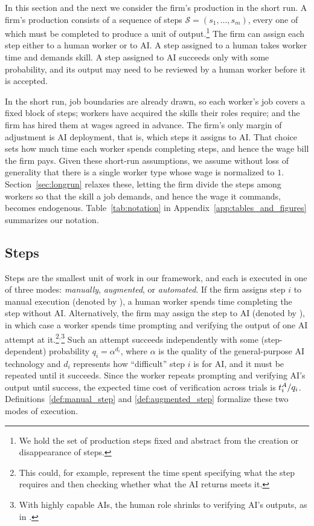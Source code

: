 In this section and the next we consider the firm's production in the short run.
A firm's production consists of a sequence of steps $\mathcal{S}=(s_1,\ldots,s_m)$, every one of which must be completed to produce a unit of output.\footnote{
We hold the set of production steps fixed and abstract from the creation or disappearance of steps.
}
The firm can assign each step either to a human worker or to AI.
A step assigned to a human takes worker time and demands skill.
A step assigned to AI succeeds only with some probability, and its output may need to be reviewed by a human worker before it is accepted.

In the short run, job boundaries are already drawn, so each worker's job covers a fixed block of steps; workers have acquired the skills their roles require; and the firm has hired them at wages agreed in advance.
The firm's only margin of adjustment is AI deployment, that is, which steps it assigns to AI.
That choice sets how much time each worker spends completing steps, and hence the wage bill the firm pays.
Given these short-run assumptions, we assume without loss of generality that there is a single worker type whose wage is normalized to $1$.
Section~\ref{sec:longrun} relaxes these, letting the firm divide the steps among workers so that the skill a job demands, and hence the wage it commands, becomes endogenous.
Table~\ref{tab:notation} in Appendix~\ref{app:tables_and_figures} summarizes our notation.

\subsection{Steps}
\label{sec:model.steps}

Steps are the smallest unit of work in our framework, and each is executed in one of three modes: \emph{manually}, \emph{augmented}, or \emph{automated}.
If the firm assigns step $i$ to manual execution (denoted by \manualLetter), a human worker spends time  completing the step without AI.
Alternatively, the firm may assign the step to AI (denoted by \AIletter), in which case a worker spends time  prompting and verifying the output of one AI attempt at it.\footnote{This could, for example, represent the time spent specifying what the step requires and then checking whether what the AI returns meets it.}$^{,}$\footnote{With highly capable AIs, the human role shrinks to verifying AI's outputs, as in \cite{agrawal2019exploring}.}
Such an attempt succeeds independently with some (step-dependent) probability $q_i=\alpha^{d_i}$, where $\alpha$ is the quality of the general-purpose AI technology and $d_i$ represents how ``difficult'' step $i$ is for AI, and it must be repeated until it succeeds. 
Since the worker repeats prompting and verifying AI's output until success, the expected time cost of verification across trials is $t^{A}_{i}/q_i$.
Definitions~\ref{def:manual_step} and \ref{def:augmented_step} formalize these two modes of execution.

